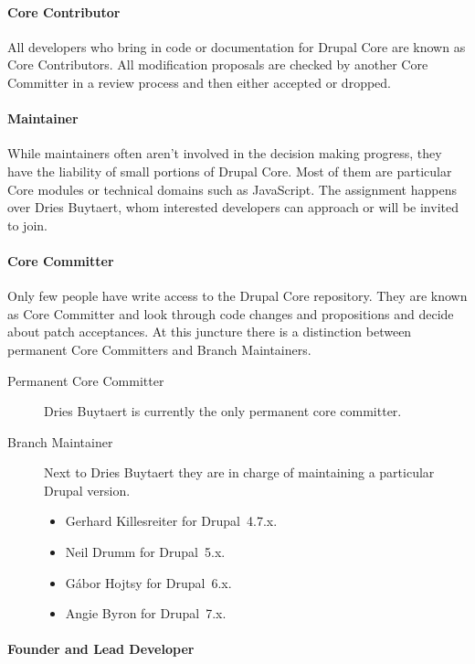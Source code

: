 \paragraph{Core Contributor}

All developers who bring in code or documentation for Drupal Core are known as
Core Contributors. All modification proposals are checked by another Core
Committer in a review process and then either accepted or dropped.

\paragraph{Maintainer}

While maintainers often aren't involved in the decision making progress, they
have the liability of small portions of Drupal Core. Most of them are
particular Core modules or technical domains such as JavaScript. The assignment
happens over Dries Buytaert, whom interested developers can approach or will be
invited to join.

\paragraph{Core Committer}

Only few people have write access to the Drupal Core repository. They are known
as Core Committer and look through code changes and propositions and decide
about patch acceptances. At this juncture there is a distinction between
permanent Core Committers and Branch Maintainers.

\begin{description}
  \item[Permanent Core Committer] Dries Buytaert is currently the only permanent core
    committer.
  \item[Branch Maintainer] Next to Dries Buytaert they are in charge of
  maintaining a particular Drupal version.
  \begin{itemize}
    \item Gerhard Killesreiter for Drupal~4.7.x.
    \item Neil Drumm for Drupal~5.x.
    \item Gábor Hojtsy for Drupal~6.x.
    \item Angie Byron for Drupal~7.x.
  \end{itemize}
\end{description}

\paragraph{Founder and Lead Developer}

